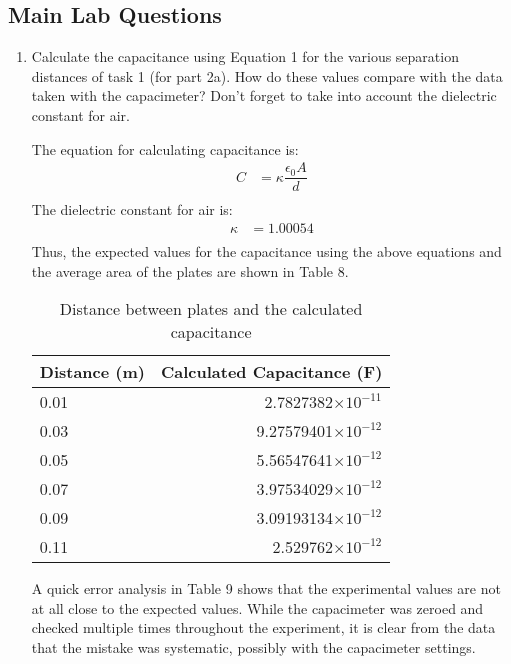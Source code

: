 \documentclass [12pt, letterpaper, twoside] {article}
\begin{document}
\subsection* {Main Lab Questions}
\begin{enumerate}
  \item Calculate the capacitance using Equation 1 for the various separation distances of task 1 (for part 2a). How do these values compare with the data taken with the capacimeter?  Don’t forget to take into account the dielectric constant for air.

  The equation for calculating capacitance is:
  \begin{equation}
    \begin{split}
      C &= \kappa\dfrac{\epsilon_{0}A}{d} \\
    \end{split}
  \end{equation}
  The dielectric constant for air is:
  \begin{equation*}
    \begin{split}
      \kappa &= 1.00054 \\
    \end{split} 
  \end{equation*}
  Thus, the expected values for the capacitance using the above equations and the average area of the plates are shown in Table 8.
  \begin{table}
    \centering
    \begin{tabular}{| l | r |}
      \hline\hline
      Distance (m) & Calculated Capacitance (F) \\
      \hline
      0.01 & 2.7827382\(\times10^{-11}\) \\
      \hline
      0.03 & 9.27579401\(\times10^{-12}\) \\
      \hline
      0.05 & 5.56547641\(\times10^{-12}\) \\
      \hline
      0.07 & 3.97534029\(\times10^{-12}\) \\
      \hline
      0.09 & 3.09193134\(\times10^{-12}\) \\
      \hline
      0.11 & 2.529762\(\times10^{-12}\) \\
      \hline\hline
    \end{tabular}
    \caption{Distance between plates and the calculated capacitance}
  \end{table}
  A quick error analysis in Table 9 shows that the experimental values are not at all close to the expected values. While the capacimeter was zeroed and checked multiple times throughout the experiment, it is clear from the data that the mistake was systematic, possibly with the capacimeter settings. 


\end{enumerate}
\end{document}
